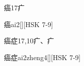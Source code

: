 \begin{Entry}{癌}{17}{⽧}
  \begin{Phonetics}{癌}{ai2}[][HSK 7-9]
  \end{Phonetics}
\end{Entry}

\begin{Entry}{癌症}{17,10}{⽧、⽧}
  \begin{Phonetics}{癌症}{ai2zheng4}[][HSK 7-9]
  \end{Phonetics}
\end{Entry}


